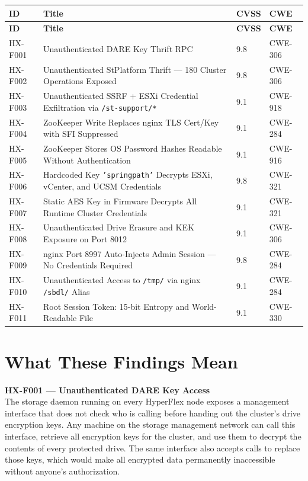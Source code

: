 \documentclass[11pt,a4paper]{article}
\begin{document}
\begin{longtable}{L{1.4cm} L{7.5cm} L{1.2cm} L{1.8cm}}
\toprule
\textbf{ID} & \textbf{Title} & \textbf{CVSS} & \textbf{CWE} \\
\midrule
\endfirsthead
\toprule
\textbf{ID} & \textbf{Title} & \textbf{CVSS} & \textbf{CWE} \\
\midrule
\endhead
\bottomrule
\endfoot
HX-F001 & Unauthenticated DARE Key Thrift RPC & 9.8 & CWE-306 \\
HX-F002 & Unauthenticated StPlatform Thrift --- 180 Cluster Operations Exposed & 9.8 & CWE-306 \\
HX-F003 & Unauthenticated SSRF + ESXi Credential Exfiltration via \texttt{/st-support/*} & 9.1 & CWE-918 \\
HX-F004 & ZooKeeper Write Replaces nginx TLS Cert/Key with SFI Suppressed & 9.1 & CWE-284 \\
HX-F005 & ZooKeeper Stores OS Password Hashes Readable Without Authentication & 9.1 & CWE-916 \\
HX-F006 & Hardcoded Key \texttt{'springpath'} Decrypts ESXi, vCenter, and UCSM Credentials & 9.8 & CWE-321 \\
HX-F007 & Static AES Key in Firmware Decrypts All Runtime Cluster Credentials & 9.1 & CWE-321 \\
HX-F008 & Unauthenticated Drive Erasure and KEK Exposure on Port 8012 & 9.1 & CWE-306 \\
HX-F009 & nginx Port 8997 Auto-Injects Admin Session --- No Credentials Required & 9.8 & CWE-284 \\
HX-F010 & Unauthenticated Access to \texttt{/tmp/} via nginx \texttt{/sbdl/} Alias & 9.1 & CWE-284 \\
HX-F011 & Root Session Token: 15-bit Entropy and World-Readable File & 9.1 & CWE-330 \\
\bottomrule
\end{longtable}

\section*{What These Findings Mean}

\textbf{HX-F001 --- Unauthenticated DARE Key Access}\\
The storage daemon running on every HyperFlex node exposes a management
interface that does not check who is calling before handing out the cluster's
drive encryption keys. Any machine on the storage management network can call
this interface, retrieve all encryption keys for the cluster, and use them to
decrypt the contents of every protected drive. The same interface also accepts
calls to replace those keys, which would make all encrypted data permanently
inaccessible without anyone's authorization.
\end{document}
